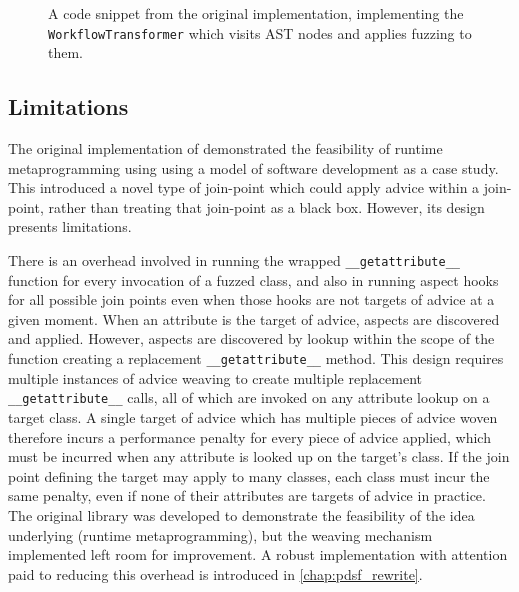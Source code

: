 \begin{figure}
    \centering
    
    \caption{A code snippet from the original \pdsf implementation, implementing
    the \lstinline{WorkflowTransformer} which visits AST nodes and applies
    fuzzing to them.}
    \label{fig:workflowtransformer_implementation}
\end{figure}


\subsection{Limitations}\label{subsec:prior_work_pdsf_limitations}

The original implementation of \pdsf demonstrated the feasibility of runtime
metaprogramming using \aop{} using a model of software development as a case
study. This introduced a novel type of join-point which could apply advice
within a join-point, rather than treating that join-point as a black box.
However, its design presents limitations.

There is an overhead involved in running the wrapped
\lstinline{__getattribute__} function for every invocation of a fuzzed class,
and also in running aspect hooks for all possible join points even when those
hooks are not targets of advice at a given moment. When an attribute is the
target of advice, aspects are discovered and applied. However, aspects are
discovered by lookup within the scope of the function creating a replacement
\lstinline{__getattribute__} method. This design requires multiple instances
of advice weaving to create multiple replacement \lstinline{__getattribute__}
calls, all of which are invoked on any attribute lookup on a target class. A single target of
advice which has multiple pieces of advice woven therefore incurs a performance
penalty for every piece of advice applied, which must be incurred when any
attribute is looked up on the target's class. If the join point defining the
target may apply to many classes, each class must incur the same penalty, even
if none of their attributes are targets of advice in practice. The original
library was developed to demonstrate the feasibility of the idea underlying
\pdsf{} (runtime metaprogramming), but the weaving mechanism implemented left
room for improvement. A robust implementation with attention paid to reducing
this overhead is introduced in \cref{chap:pdsf_rewrite}.

